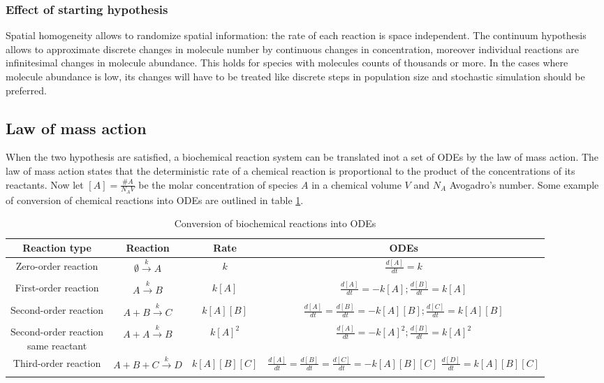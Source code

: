     \subsubsection{Effect of starting hypothesis}
    Spatial homogeneity allows to randomize spatial information: the rate of each reaction is space independent.
    The continuum hypothesis allows to approximate discrete changes in molecule number by continuous changes in concentration, moreover individual reactions are infinitesimal changes in molecule abundance.
    This holds for species with molecules counts of thousands or more.
    In the cases where molecule abundance is low, its changes will have to be treated like discrete steps in population size and stochastic simulation should be preferred.

  \subsection{Law of mass action}
  When the two hypothesis are satisfied, a biochemical reaction system can be translated inot a set of ODEs by the law of mass action.
  The law of mass action states that the deterministic rate of a chemical reaction is proportional to the product of the concentrations of its reactants.
  Now let $[A] = \frac{\# A}{N_AV}$ be the molar concentration of species $A$ in a chemical volume $V$ and $N_A$ Avogadro's number.
  Some example of conversion of chemical reactions into ODEs are outlined in table \ref{tab:chem-odes}.

  \begin{table}[H]
    \centering
    \begin{tabular}{c c c c}
      \hline
      Reaction type & Reaction & Rate & ODEs\\
      \hline
      Zero-order reaction & $\emptyset\xrightarrow[]{k} A$ & $k$ & $\frac{d[A]}{dt} = k$\\
      First-order reaction & $A\xrightarrow[]{k} B$ & $k[A]$ & $\frac{d[A]}{dt} = -k[A];\frac{d[B]}{dt} = k[A]$\\
      Second-order reaction & $A+B\xrightarrow[]{k} C$ & $k[A][B]$ & $\frac{d[A]}{dt} = \frac{d[B]}{dt} = -k[A][B];\frac{d[C]}{dt} = k[A][B]$\\
      \makecell{Second-order reaction\\ same reactant} & $A+A\xrightarrow[]{k} B$ & $k[A]^2$ & $\frac{d[A]}{dt} = -k[A]^2;\frac{d[B]}{dt} = k[A]^2$\\
      Third-order reaction & $A+B+C\xrightarrow[]{k} D$ & $k[A][B][C]$ & \makecell{$\frac{d[A]}{dt} = \frac{d[B]}{dt} = \frac{d[C]}{dt} =  -k[A][B][C]$\\$\frac{d[D]}{dt} = k[A][B][C]$}\\
      \hline
    \end{tabular}
    \caption{Conversion of biochemical reactions into ODEs}
    \label{tab:chem-odes}
  \end{table}

